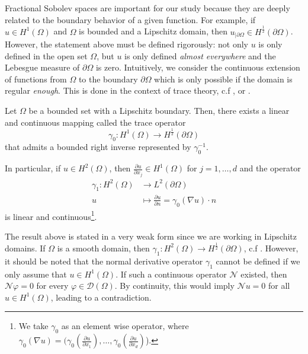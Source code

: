 Fractional Sobolev spaces are important for our study because they are deeply related to the boundary behavior of a given function. For example, if \(u \in H^1(\Omega)\) and \(\Omega\) is bounded and a Lipschitz domain, then \(u_{|\partial\Omega} \in H^\frac{1}{2}(\partial\Omega)\). However, the statement above must be defined rigorously: not only \(u\) is only defined in the open set \(\Omega\), but \(u\) is only defined \textit{almost everywhere} and the Lebesgue measure of \(\partial\Omega\) is zero. Intuitively, we consider the continuous extension of functions from \(\Omega\) to the boundary \(\partial\Omega\) which is only possible if the domain is regular \textit{enough}. This is done in the context of trace theory, c.f \cite{geymonat2007trace}, \cite{necas2011direct} or \cite{adams2003sobolev}.
\begin{theorem}\label{frac_theo}
    Let \(\Omega\) be a bounded set with a Lipschitz boundary. Then, there exists a linear and continuous mapping called the trace operator
    \[
    \gamma_0: H^1(\Omega) \rightarrow H^{\frac{1}{2}}(\partial\Omega)    
    \]
    that admits a bounded right inverse represented by \(\gamma_0^{-1}\).

    In particular, if \(u \in H^2(\Omega)\), then \(\frac{\partial u}{\partial x_j} \in H^1(\Omega)\) for \(j=1,\dots,d\) and the operator
    \begin{align*}
        \gamma_1: H^2(\Omega) &\rightarrow L^2(\partial\Omega)\\
        u &\mapsto \frac{\partial u}{\partial n} = \gamma_0(\nabla u)\cdot n
    \end{align*}
    is linear and continuous\footnote{We take \(\gamma_0\) as an element wise operator, where \(\gamma_0(\nabla u) = \Big(\gamma_0(\frac{\partial u}{\partial x_1}),\dots,\gamma_0(\frac{\partial u}{\partial x_d})\)\Big).}.  
\end{theorem}
The result above is stated in a very weak form since we are working in Lipschitz domains. If $\Omega$ is a smooth domain, then $\gamma_1: H^2(\Omega) \rightarrow H^{\frac{1}{2}}(\partial\Omega)$, c.f \cite{lions2012non}. However, it should be noted that the normal derivative operator $\gamma_1$ cannot be defined if we only assume that $u \in H^1(\Omega)$. If such a continuous operator $\mathcal{N}$ existed, then $\mathcal{N}\varphi = 0$ for every $\varphi \in \mathcal{D}(\Omega)$. By continuity, this would imply $\mathcal{N}u=0$ for all $u \in H^1(\Omega)$, leading to a contradiction.

